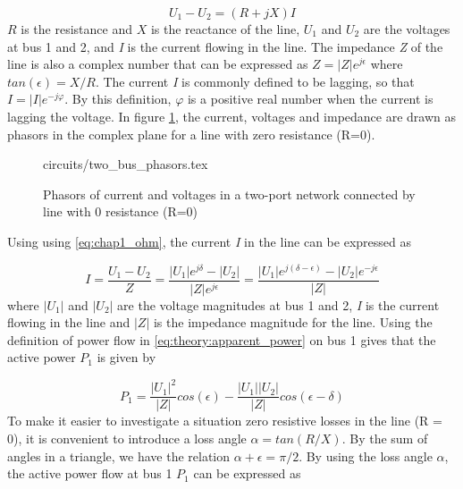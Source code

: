 \documentclass[class=book, crop=false]{standalone}
\begin{document}
\begin{equation}\label{eq:chap1_ohm}
    U_{1} - U_{2} = (R + jX)I
\end{equation}
$R$ is the resistance and $X$ is the reactance of the line, $U_{1}$ and $U_{2}$ are the voltages at bus 1 and 2, and \textit{I} is the current flowing in the line. The impedance \textit{Z} of the line is also a complex number that can be expressed as $Z = |Z|e^{j\epsilon}$ where $tan (\epsilon) = X/R$. The current \textit{I} is commonly defined to be lagging, so that $I = |I|e^{-j\varphi}$. By this definition, $\varphi$ is a positive real number when the current is lagging the voltage. In figure \ref{fig:theory:two_bus_phasor}, the current, voltages and impedance are drawn as phasors in the complex plane for a line with zero resistance (R=0).


\begin{figure}[ht!]
    \center
    {circuits/two_bus_phasors.tex}
    \caption[size = 9]{Phasors of current and voltages in a two-port network connected by line with 0 resistance (R=0)}
    \label{fig:theory:two_bus_phasor}
\end{figure}

Using using \eqref{eq:chap1_ohm}, the current \textit{I} in the line can be expressed as

\begin{equation}\label{eq:two_port_current}
    I  = \frac{U_{1} - U_{2}}{Z}
    = \frac{|U_{1}|e^{j\delta} - |U_{2}|}{|Z|e^{j\epsilon}}
    = \frac{|U_{1}|e^{j(\delta- \epsilon)} - |U_{2}|e^{-j\epsilon}}{|Z|}
\end{equation}
where $|U_{1}|$ and $|U_{2}|$ are the voltage magnitudes at bus 1 and 2, \textit{I} is the current flowing in the line and $|Z|$ is the impedance magnitude for the line. Using the definition of power flow in \eqref{eq:theory:apparent_power} on bus 1 gives that the active power $P_{1}$ is given by

\begin{equation}\label{eq:two_port_active_power}
P_{1} = \frac{|U_{1}|^2}{|Z|}cos(\epsilon) - \frac{|U_{1}||U_{2}|}{|Z|}cos(\epsilon - \delta)
\end{equation}
To make it easier to investigate a situation zero resistive losses in the line (R = 0), it is convenient to introduce a loss angle $\alpha = tan(R/X)$. By the sum of angles in a triangle, we have the relation $\alpha + \epsilon = \pi/2$. By using the loss angle $\alpha$, the active power flow at bus 1 $P_{1}$ can be expressed as
\end{document}
